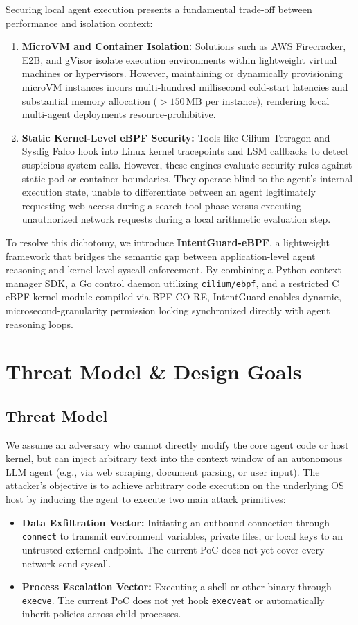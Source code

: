 \documentclass[conference]{IEEEtran}
\begin{document}
Securing local agent execution presents a fundamental trade-off between performance and isolation context:
\begin{enumerate}
    \item \textbf{MicroVM and Container Isolation:} Solutions such as AWS Firecracker, E2B, and gVisor isolate execution environments within lightweight virtual machines or hypervisors. However, maintaining or dynamically provisioning microVM instances incurs multi-hundred millisecond cold-start latencies and substantial memory allocation ($>150\,\text{MB}$ per instance), rendering local multi-agent deployments resource-prohibitive.
    \item \textbf{Static Kernel-Level eBPF Security:} Tools like Cilium Tetragon and Sysdig Falco hook into Linux kernel tracepoints and LSM callbacks to detect suspicious system calls. However, these engines evaluate security rules against static pod or container boundaries. They operate blind to the agent's internal execution state, unable to differentiate between an agent legitimately requesting web access during a search tool phase versus executing unauthorized network requests during a local arithmetic evaluation step.
\end{enumerate}

To resolve this dichotomy, we introduce \textbf{IntentGuard-eBPF}, a lightweight framework that bridges the semantic gap between application-level agent reasoning and kernel-level syscall enforcement. By combining a Python context manager SDK, a Go control daemon utilizing \texttt{cilium/ebpf}, and a restricted C eBPF kernel module compiled via BPF CO-RE, IntentGuard enables dynamic, microsecond-granularity permission locking synchronized directly with agent reasoning loops.

\section{Threat Model \& Design Goals}

\subsection{Threat Model}
We assume an adversary who cannot directly modify the core agent code or host kernel, but can inject arbitrary text into the context window of an autonomous LLM agent (e.g., via web scraping, document parsing, or user input). The attacker's objective is to achieve arbitrary code execution on the underlying OS host by inducing the agent to execute two main attack primitives:
\begin{itemize}
    \item \textbf{Data Exfiltration Vector:} Initiating an outbound connection through \texttt{connect} to transmit environment variables, private files, or local keys to an untrusted external endpoint. The current PoC does not yet cover every network-send syscall.
    \item \textbf{Process Escalation Vector:} Executing a shell or other binary through \texttt{execve}. The current PoC does not yet hook \texttt{execveat} or automatically inherit policies across child processes.
\end{itemize}
\end{document}
